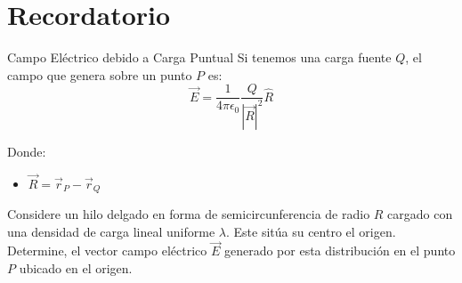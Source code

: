 \documentclass[11pt]{article}
\begin{document}
\crearEncabezado

\section*{Recordatorio}

\begin{boxTeoria}{Campo Eléctrico debido a Carga Puntual}
    Si tenemos una carga fuente $Q$, el campo que genera sobre un punto
    $P$ es:
    \begin{equation*}
        \vec{E} = \frac{1}{4\pi\epsilon_0} \frac{Q}{|\vec{R}|^2} \hat{R}
    \end{equation*}

    Donde:
    \begin{itemize}
        \item $\vec{R} = \vec{r}_P - \vec{r}_Q$
    \end{itemize}
\end{boxTeoria}

Considere un hilo delgado en forma de semicircunferencia de radio $R$ cargado con una densidad de carga lineal uniforme $\lambda$. Este sitúa su centro el origen. Determine, el vector campo eléctrico $\vec{E}$ generado por esta distribución en el punto $P$ ubicado en el origen.

\begin{center}
    \shorthandoff{>}
    \shorthandon{>}
\end{center}
\end{document}

